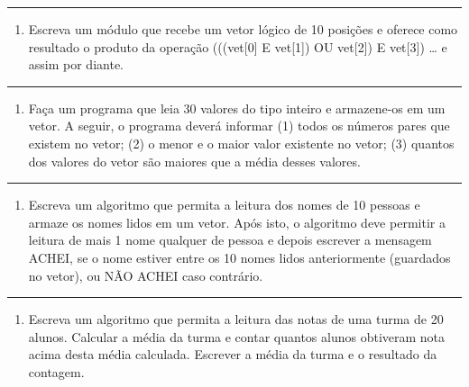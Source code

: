 \documentclass[12pt,a4paper]{article}
\renewcommand{\linethickness}{0.05em}
\providecommand{\tightlist}{%
      \setlength{\itemsep}{0pt}\setlength{\parskip}{0pt}}
\begin{document}
    \begin{center}\rule{0.5\linewidth}{\linethickness}\end{center}

\begin{enumerate}
\def\labelenumi{\arabic{enumi}.}
\setcounter{enumi}{2}
\tightlist
\item
  Escreva um módulo que recebe um vetor lógico de 10 posições e oferece
  como resultado o produto da operação (((vet{[}0{]} E vet{[}1{]}) OU
  vet{[}2{]}) E vet{[}3{]}) \ldots{} e assim por diante.
\end{enumerate}

    \begin{center}\rule{0.5\linewidth}{\linethickness}\end{center}

\begin{enumerate}
\def\labelenumi{\arabic{enumi}.}
\setcounter{enumi}{3}
\tightlist
\item
  Faça um programa que leia 30 valores do tipo inteiro e armazene-os em
  um vetor. A seguir, o programa deverá informar (1) todos os números
  pares que existem no vetor; (2) o menor e o maior valor existente no
  vetor; (3) quantos dos valores do vetor são maiores que a média desses
  valores.
\end{enumerate}

    \begin{center}\rule{0.5\linewidth}{\linethickness}\end{center}

\begin{enumerate}
\def\labelenumi{\arabic{enumi}.}
\setcounter{enumi}{4}
\tightlist
\item
  Escreva um algoritmo que permita a leitura dos nomes de 10 pessoas e
  armaze os nomes lidos em um vetor. Após isto, o algoritmo deve
  permitir a leitura de mais 1 nome qualquer de pessoa e depois escrever
  a mensagem ACHEI, se o nome estiver entre os 10 nomes lidos
  anteriormente (guardados no vetor), ou NÃO ACHEI caso contrário.
\end{enumerate}

    \begin{center}\rule{0.5\linewidth}{\linethickness}\end{center}

\begin{enumerate}
\def\labelenumi{\arabic{enumi}.}
\setcounter{enumi}{5}
\tightlist
\item
  Escreva um algoritmo que permita a leitura das notas de uma turma de
  20 alunos. Calcular a média da turma e contar quantos alunos obtiveram
  nota acima desta média calculada. Escrever a média da turma e o
  resultado da contagem.
\end{enumerate}
\end{document}

